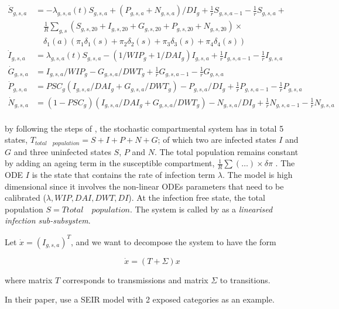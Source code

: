 \documentclass[12pt]{article}
\begin{document}
\begin{align*}
\dot{S}_{g,s,a} & =  -\lambda_{g,s,a}(t)S_{g,s,a} + (P_{g,s,a} + N_{g,s,a})/DI_g + \frac{1}{r}S_{g,s,a-1} - \frac{1}{r}S_{g,s,a} + \\
& \quad \frac{1}{R}\sum_{g,s}(S_{g,s,20} + I_{g,s,20} + G_{g,s,20} + P_{g,s,20} + N_{g,s,20}) \times \\
& \quad \delta_1(a)(\pi_1\delta_1(s) + \pi_2\delta_2(s) + \pi_3\delta_3(s) + \pi_4\delta_4(s)) \\ 
\dot{I}_{g,s,a}  & =  \lambda_{g,s,a}(t)S_{g,s,a} - (1/WIP_g + 1/DAI_g)I_{g,s,a} + \frac{1}{r}I_{g,s,a-1}-\frac{1}{r}I_{g,s,a} \\
\dot{G}_{g,s,a}  & =  I_{g,s,a}/WIP_g - G_{g,s,a}/DWT_g + \frac{1}{r}G_{g,s,a-1} - \frac{1}{r}G_{g,s,a} \\ 
\dot{P}_{g,s,a}  & =  PSC_g(I_{g,s,a}/DAI_g + G_{g,s,a}/DWT_g) - P_{g,s,a}/DI_g + \frac{1}{r}P_{g,s,a-1} - \frac{1}{r}P_{g,s,a} \\
\dot{N}_{g,s,a}  & =  (1-PSC_g)(I_{g,s,a}/DAI_g + G_{g,s,a}/DWT_g) - N_{g,s,a}/DI_g + \frac{1}{r}N_{g,s,a-1}-\frac{1}{r}N_{g,s,a} \\
\end{align*}

by following the steps of \cite[p.875]{Diekmann:2010}, the stochastic compartmental system has in total 5 states, $T_{total \quad population} = S + I + P + N + G$; of which two are infected states $I$ and $G$ and three uninfected states $S$, $P$ and $N$. The total population remains constant by adding an ageing term in the susceptible compartment, $\frac{1}{R}\sum(\dots)\times\delta\pi$ \cite[p.7]{Gareth:2013}. The ODE $I$ is the state that contains the rate of infection term $\lambda$. The model is high dimensional since it involves the non-linear ODEs parameters that need to be calibrated ($\lambda, WIP, DAI, DWT, DI$). At the infection free state, the total population $S=T{total \quad population}$. The system is called by \cite{Diekmann:2010} as a \textit{linearised infection sub-subsystem}. 

Let $\dot{x} = (I_{g,s,a})^{T}$, and we want to decompose the system to  have the form

\begin{equation}
\dot{x} = (T + \Sigma)x
\end{equation} 

where matrix $T$ corresponds to transmissions and matrix $\Sigma$ to transitions. 

In their paper, \cite[p.875]{Diekmann:2010} use a SEIR model with 2 exposed categories as an example.
\end{document}
